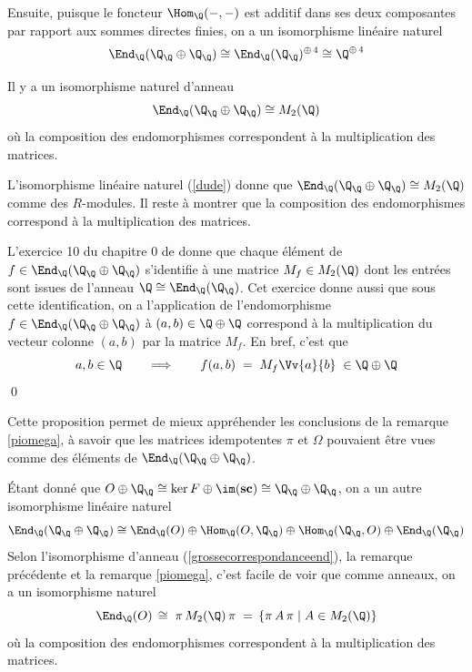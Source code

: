 Ensuite, puisque le foncteur $\Hom_\Q(-,-)$ est additif dans ses deux composantes par rapport aux sommes directes finies, on a un isomorphisme linéaire naturel
\begin{equation} \label{dude}
\End_\Q(\Q_\Q \oplus \Q_\Q) \cong \End_\Q(\Q_\Q)^{\oplus \, 4} \cong \Q^{\oplus \, 4}
\end{equation}

\begin{Prop} Il y a un isomorphisme naturel d'anneau
\begin{equation} \label{grossecorrespondanceend}
\End_\Q(\Q_\Q \oplus \Q_\Q) \cong M_2(\Q)
\end{equation}
où la composition des endomorphismes correspondent à la multiplication des matrices.

\begin{pre} L'isomorphisme linéaire naturel (\ref{dude}) donne que $\End_\Q(\Q_\Q \oplus \Q_\Q) \cong M_2(\Q)$ comme des $R$-modules. Il reste à montrer que la composition des endomorphismes correspond à la multiplication des matrices.

L'exercice 10 du chapitre 0 de \cite{FDnoncom} donne que chaque élément de $f \in \End_\Q(\Q_\Q \oplus \Q_\Q)$ s'identifie à une matrice $M_f \in M_2(\Q)$ dont les entrées sont issues de l'anneau $\Q \cong \End_\Q(\Q_\Q) $. Cet exercice donne aussi que sous cette identification, on a l'application de l'endomorphisme $f \in \End_\Q(\Q_\Q \oplus \Q_\Q)$ à $(a,b) \in \Q \oplus \Q$ correspond à la multiplication du vecteur colonne $(a,b)$ par la matrice $M_f$. En bref, c'est que
$$ a,b \in \Q \qquad \Longrightarrow \qquad f(a,b) \; = \; M_f \Vv{a}{b} \; \in \Q \oplus \Q $$
\qed
\end{pre}
\end{Prop}

\begin{Rem} Cette proposition permet de mieux appréhender les conclusions de la remarque \ref{piomega}, à savoir que les matrices idempotentes $\pi$ et $\Omega$ pouvaient être vues comme des éléments de $\End_\Q(\Q_\Q \oplus \Q_\Q)$.
\end{Rem}

Étant donné que $O \oplus \Q_\Q \cong \ker F \oplus \im (\mathbf{sc}) \cong \Q_\Q \oplus \Q_\Q$, on a un autre isomorphisme linéaire naturel
\begin{equation}
\End_\Q(\Q_\Q \oplus \Q_\Q) \cong \End_\Q(O) \oplus \Hom_\Q(O,\Q_\Q) \oplus \Hom_\Q(\Q_\Q,O) \oplus \End_\Q(\Q_\Q)
\end{equation}
Selon l'isomorphisme d'anneau (\ref{grossecorrespondanceend}), la remarque précédente et la remarque \ref{piomega}, c'est facile de voir que comme anneaux, on a un isomorphisme naturel
\begin{equation}
\End_\Q(O) \, \cong \; \pi \, M_2(\Q) \, \pi \; = \, \left\{ \pi \, A \, \pi \; | \; A \in M_2(\Q)\right\}
\end{equation}
où la composition des endomorphismes correspondent à la multiplication des matrices.

